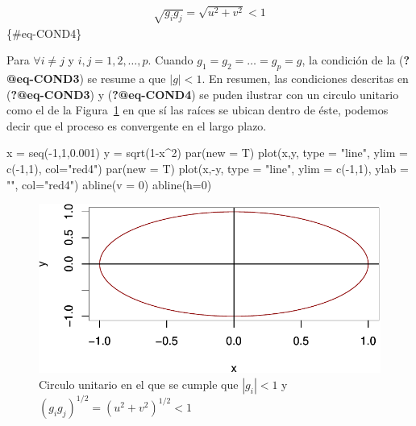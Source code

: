 \documentclass[
  a4paper,
]{article}
\newenvironment{Shaded}{}{}
\newcommand{\AttributeTok}[1]{\textcolor[rgb]{0.84,0.23,0.29}{#1}}
\newcommand{\DecValTok}[1]{\textcolor[rgb]{0.00,0.36,0.77}{#1}}
\newcommand{\FloatTok}[1]{\textcolor[rgb]{0.00,0.36,0.77}{#1}}
\newcommand{\FunctionTok}[1]{\textcolor[rgb]{0.44,0.26,0.76}{#1}}
\newcommand{\NormalTok}[1]{\textcolor[rgb]{0.14,0.16,0.18}{#1}}
\newcommand{\OtherTok}[1]{\textcolor[rgb]{0.44,0.26,0.76}{#1}}
\newcommand{\SpecialCharTok}[1]{\textcolor[rgb]{0.00,0.36,0.77}{#1}}
\newcommand{\StringTok}[1]{\textcolor[rgb]{0.01,0.18,0.38}{#1}}
\begin{document}
\begin{align}
\sqrt{g_i g_j} = \sqrt{u^2 + v^2} < 1
\end{align} \{\#eq-COND4\}

Para \(\forall i \neq j\) y \(i, j = 1, 2, \ldots, p\). Cuando
\(g_1 = g_2 = \ldots = g_p = g\), la condición de la
(\textbf{?@eq-COND3}) se resume a que \(|g| < 1\). En resumen, las
condiciones descritas en (\textbf{?@eq-COND3}) y (\textbf{?@eq-COND4})
se puden ilustrar con un circulo unitario como el de la
Figura~\ref{fig-fig24} en que sí las raíces se ubican dentro de éste,
podemos decir que el proceso es convergente en el largo plazo.

\begin{Shaded}
\begin{Highlighting}[]
\NormalTok{x }\OtherTok{=} \FunctionTok{seq}\NormalTok{(}\SpecialCharTok{{-}}\DecValTok{1}\NormalTok{,}\DecValTok{1}\NormalTok{,}\FloatTok{0.001}\NormalTok{)}
\NormalTok{y }\OtherTok{=} \FunctionTok{sqrt}\NormalTok{(}\DecValTok{1}\SpecialCharTok{{-}}\NormalTok{x}\SpecialCharTok{\^{}}\DecValTok{2}\NormalTok{)}
\FunctionTok{par}\NormalTok{(}\AttributeTok{new =}\NormalTok{ T)}
\FunctionTok{plot}\NormalTok{(x,y, }\AttributeTok{type =} \StringTok{"line"}\NormalTok{, }\AttributeTok{ylim =} \FunctionTok{c}\NormalTok{(}\SpecialCharTok{{-}}\DecValTok{1}\NormalTok{,}\DecValTok{1}\NormalTok{), }\AttributeTok{col=}\StringTok{"red4"}\NormalTok{)}
\FunctionTok{par}\NormalTok{(}\AttributeTok{new =}\NormalTok{ T)}
\FunctionTok{plot}\NormalTok{(x,}\SpecialCharTok{{-}}\NormalTok{y, }\AttributeTok{type =} \StringTok{"line"}\NormalTok{, }\AttributeTok{ylim =} \FunctionTok{c}\NormalTok{(}\SpecialCharTok{{-}}\DecValTok{1}\NormalTok{,}\DecValTok{1}\NormalTok{), }\AttributeTok{ylab =} \StringTok{""}\NormalTok{, }\AttributeTok{col=}\StringTok{"red4"}\NormalTok{)}
\FunctionTok{abline}\NormalTok{(}\AttributeTok{v =} \DecValTok{0}\NormalTok{)}
\FunctionTok{abline}\NormalTok{(}\AttributeTok{h=}\DecValTok{0}\NormalTok{)}
\end{Highlighting}
\end{Shaded}

\begin{figure}[H]

\caption{\label{fig-fig24}Circulo unitario en el que se cumple que
\(|g_i|<1\) y \((g_i g_j)^{1/2} = (u^2 + v^2)^{1/2} < 1\)}

{\centering \includegraphics{index_files/figure-pdf/fig-fig24-1.pdf}

}

\end{figure}
\end{document}
